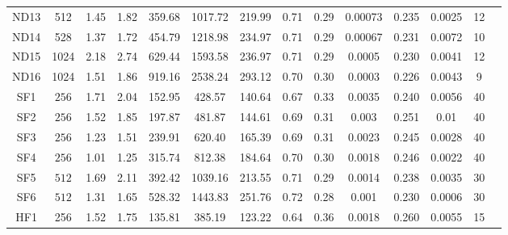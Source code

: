 \documentclass[aps,pre,onecolumn,superscriptaddress,notitlepage]{revtex4-1}
\begin{document}
\begin{table}[]
\begin{center}
\begin{tabular}{cccccccccccccc}
ND13 & 512 & 1.45 & 1.82 & 359.68 & 1017.72 & 219.99 & 0.71&0.29 & 0.00073 & 0.235 & 0.0025 & 12 \\ %
ND14 & 528 & 1.37 & 1.72 & 454.79 & 1218.98 & 234.97 & 0.71& 0.29& 0.00067 & 0.231 & 0.0072 & 10 \\ %
ND15 & 1024 & 2.18 & 2.74 & 629.44 & 1593.58 & 236.97 & 0.71& 0.29& 0.0005 & 0.230 & 0.0041 & 12 \\ %
ND16 & 1024 & 1.51 & 1.86 & 919.16 & 2538.24 & 293.12  & 0.70 & 0.30 & 0.0003 & 0.226 & 0.0043 & 9 \\ %
  \hline
  SF1&$256$ & 1.71 &  2.04 & 152.95 & 428.57 & 140.64 & 0.67 &0.33 & 0.0035 & 0.240 & 0.0056 & 40\\ %
  SF2&$256$ & 1.52 &  1.85 &197.87  &481.87 & 144.61 & 0.69 & 0.31& 0.003 & 0.251 & 0.01 & 40 \\ %
  SF3&$256$ & 1.23 &  1.51& 239.91 &620.40 & 165.39 & 0.69 & 0.31& 0.0023 & 0.245 & 0.0028 & 40 \\ %
  SF4&$256$ & 1.01 & 1.25 & 315.74 & 812.38& 184.64 & 0.70& 0.30& 0.0018 &0.246 &0.0022 & 40 \\ %
  SF5&$512$ &1.69 & 2.11 & 392.42 & 1039.16& 213.55 & 0.71 & 0.29& 0.0014 & 0.238 & 0.0035 & 30 \\ %
  SF6&$512$ & 1.31 & 1.65 & 528.32 &1443.83& 251.76 & 0.72 & 0.28& 0.001 & 0.230 & 0.0006 & 30 \\ %
  \hline
HF1 & 256 & 1.52 & 1.75 & 135.81 & 385.19 & 123.22 & 0.64& 0.36& 0.0018 & 0.260 & 0.0055 & 15 \\ %

\end{tabular}
\end{center}
\end{table}
\end{document}
